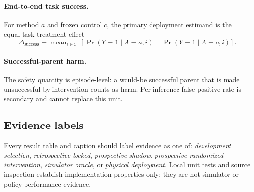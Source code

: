 \paragraph{End-to-end task success.}
For method $a$ and frozen control $c$, the primary deployment estimand is the equal-task treatment effect
\begin{equation}
  \Delta_{\mathrm{success}}
  = \operatorname{mean}_{i\in\mathcal{T}}
  [\Pr(Y=1\mid A=a,i)-\Pr(Y=1\mid A=c,i)].
  \label{eq:task-effect}
\end{equation}

\paragraph{Successful-parent harm.}
The safety quantity is episode-level: a would-be successful parent that is made unsuccessful by intervention counts as harm. Per-inference false-positive rate is secondary and cannot replace this unit.

\subsection{Evidence labels}

Every result table and caption should label evidence as one of: \emph{development selection}, \emph{retrospective locked}, \emph{prospective shadow}, \emph{prospective randomized intervention}, \emph{simulator oracle}, or \emph{physical deployment}. Local unit tests and source inspection establish implementation properties only; they are not simulator or policy-performance evidence.
